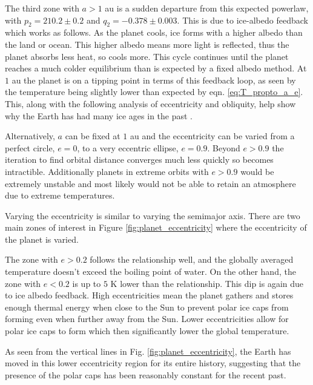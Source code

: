 \documentclass[12pt, onecolumn]{revtex4-2}    %
\begin{document}
The third zone with $a > 1$ au is a sudden departure from this expected powerlaw, with $p_2 = 210.2 \pm 0.2$ and $q_2 = -0.378 \pm 0.003$.
This is due to ice-albedo feedback which works as follows.
As the planet cools, ice forms with a higher albedo than the land or ocean.
This higher albedo means more light is reflected, thus the planet absorbs less heat, so cools more.
This cycle continues until the planet reaches a much colder equilibrium than is expected by a fixed albedo method.
At $1$ au the planet is on a tipping point in terms of this feedback loop, as seen by the temperature being slightly lower than expected by eqn. \eqref{eq:T_propto_a_e}.
This, along with the following analysis of eccentricity and obliquity, help show why the Earth has had many ice ages in the past \cite{Emiliani78}.

Alternatively, $a$ can be fixed at $1$ au and the eccentricity can be varied from a perfect circle, $e = 0$, to a very eccentric ellipse, $e = 0.9$.
Beyond $e > 0.9$ the iteration to find orbital distance converges much less quickly so becomes intractible.
Additionally planets in extreme orbits with $e > 0.9$ would be extremely unstable and most likely would not be able to retain an atmosphere due to extreme temperatures.

Varying the eccentricity is similar to varying the semimajor axis.
There are two main zones of interest in Figure \ref{fig:planet_eccentricity} where the eccentricity of the planet is varied.

The zone with $e > 0.2$ follows the relationship well, and the globally averaged temperature doesn't exceed the boiling point of water.
On the other hand, the zone with $e < 0.2$ is up to $5$ K lower than the relationship.
This dip is again due to ice albedo feedback.
High eccentricities mean the planet gathers and stores enough thermal energy when close to the Sun to prevent polar ice caps from forming even when further away from the Sun.
Lower eccentricities allow for polar ice caps to form which then significantly lower the global temperature.

As seen from the vertical lines in Fig. \ref{fig:planet_eccentricity}, the Earth has moved in this lower eccentricity region for its entire history, suggesting that the presence of the polar caps has been reasonably constant for the recent past.
\end{document}
